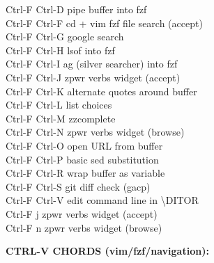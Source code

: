\documentclass[11pt,a4paper,twoside]{book}
\begin{document}
\begin{codebox}
Ctrl-F Ctrl-D         pipe buffer into fzf\\
Ctrl-F Ctrl-F         cd + vim fzf file search (accept)\\
Ctrl-F Ctrl-G         google search\\
Ctrl-F Ctrl-H         lsof into fzf\\
Ctrl-F Ctrl-I         ag (silver searcher) into fzf\\
Ctrl-F Ctrl-J         zpwr verbs widget (accept)\\
Ctrl-F Ctrl-K         alternate quotes around buffer\\
Ctrl-F Ctrl-L         list choices\\
Ctrl-F Ctrl-M         zzcomplete\\
Ctrl-F Ctrl-N         zpwr verbs widget (browse)\\
Ctrl-F Ctrl-O         open URL from buffer\\
Ctrl-F Ctrl-P         basic sed substitution\\
Ctrl-F Ctrl-R         wrap buffer as variable\\
Ctrl-F Ctrl-S         git diff check (gacp)\\
Ctrl-F Ctrl-V         edit command line in \textbackslash{}DITOR\\
Ctrl-F j              zpwr verbs widget (accept)\\
Ctrl-F n              zpwr verbs widget (browse)\\
\end{codebox}


\vspace{12pt}
{\bfseries\color{neonyellow} CTRL-V CHORDS (vim/fzf/navigation):}\vspace{4pt}
\end{document}
